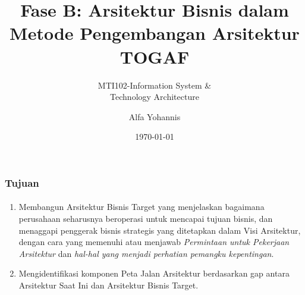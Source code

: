 \documentclass[aspectratio=169, table]{beamer}
\subtitle{MTI102-Information System \&\\Technology Architecture}
\title{Fase B: Arsitektur Bisnis dalam Metode Pengembangan Arsitektur TOGAF}
\author{Alfa Yohannis}
\date{\today}
\begin{document}
	
	\frame{\titlepage}
	
	\begin{frame}
		\frametitle{Tujuan}
		\framesubtitle{\hspace{1cm}}
		\begin{enumerate}
			\item Membangun Arsitektur Bisnis Target yang menjelaskan bagaimana perusahaan seharusnya beroperasi untuk mencapai tujuan bisnis, dan menaggapi penggerak bisnis strategis yang ditetapkan dalam Visi Arsitektur, dengan cara yang memenuhi atau menjawab \textit{Permintaan untuk Pekerjaan Arsitektur} dan \textit{hal-hal yang menjadi perhatian pemangku kepentingan}.
			
			\item Mengidentifikasi komponen Peta Jalan Arsitektur berdasarkan gap antara Arsitektur Saat Ini dan Arsitektur Bisnis Target.
		\end{enumerate}
	\end{frame}
	
\end{document}
